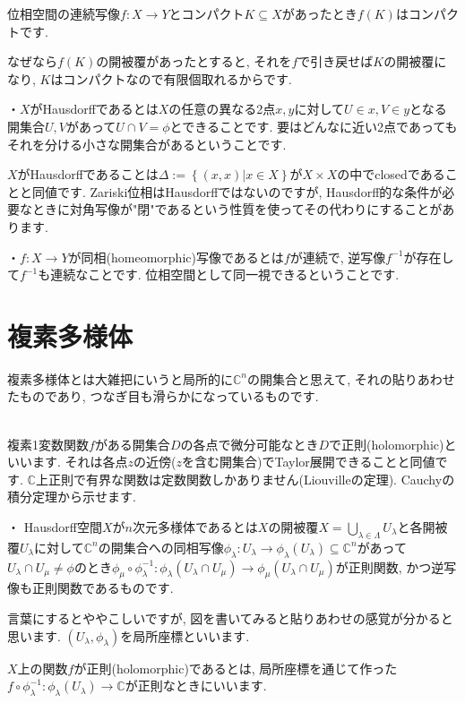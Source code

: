 \documentclass{jsarticle}
\theoremstyle{definition}
\numberwithin{theorem}{section}
\begin{document}
位相空間の連続写像$f: X \rightarrow Y$とコンパクト$K\subseteq X$があったとき$f(K)$はコンパクトです.

なぜなら$f(K)$の開被覆があったとすると, それを$f$で引き戻せば$K$の開被覆になり, $K$はコンパクトなので有限個取れるからです.

・$X$がHausdorffであるとは$X$の任意の異なる2点$x, y$に対して$U \in x, V \in y$となる開集合$U, V$があって$U \cap V = \phi$とできることです. 要はどんなに近い2点であってもそれを分ける小さな開集合があるということです.

$X$がHausdorffであることは$\Delta := \left\{(x, x) | x \in X\right\}$が$X \times X$の中でclosedであることと同値です. Zariski位相はHausdorffではないのですが, Hausdorff的な条件が必要なときに対角写像が"閉"であるという性質を使ってその代わりにすることがあります.

・$f: X \rightarrow Y$が同相(homeomorphic)写像であるとは$f$が連続で, 逆写像$f^{-1}$が存在して$f^{-1}$も連続なことです. 位相空間として同一視できるということです.

\section{複素多様体}
複素多様体とは大雑把にいうと局所的に$\mathbb{C}^n$の開集合と思えて, それの貼りあわせたものであり, つなぎ目も滑らかになっているものです.

\hrulefill\\

複素1変数関数$f$がある開集合$D$の各点で微分可能なとき$D$で正則(holomorphic)といいます. それは各点$z$の近傍($z$を含む開集合)でTaylor展開できることと同値です. $\mathbb{C}$上正則で有界な関数は定数関数しかありません(Liouvilleの定理). Cauchyの積分定理から示せます.

・ Hausdorff空間$X$が$n$次元多様体であるとは$X$の開被覆$X = \bigcup_{\lambda \in \Lambda} U_\lambda$と各開被覆$U_\lambda$に対して$\mathbb{C}^n$の開集合への同相写像$\phi_\lambda : U_\lambda \rightarrow \phi_\lambda(U_\lambda) \subseteq \mathbb{C}^n$があって$U_\lambda \cap U_\mu \neq \phi$のとき$\phi_\mu\circ\phi_\lambda^{-1} : \phi_\lambda(U_\lambda\cap U_\mu) \rightarrow \phi_\mu(U_\lambda\cap U_\mu)$が正則関数, かつ逆写像も正則関数であるものです. 

言葉にするとややこしいですが, 図を書いてみると貼りあわせの感覚が分かると思います. $(U_\lambda, \phi_\lambda)$を局所座標といいます.

$X$上の関数$f$が正則(holomorphic)であるとは, 局所座標を通じて作った$f\circ\phi_\lambda^{-1}: \phi_\lambda(U_\lambda) \rightarrow \mathbb{C}$が正則なときにいいます. 
\end{document}
